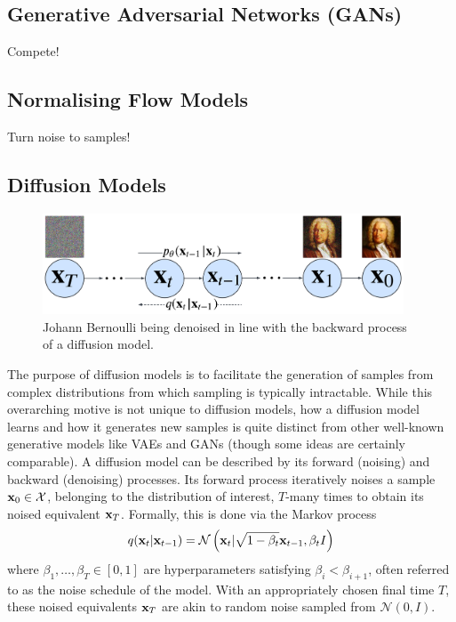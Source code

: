 \documentclass[11pt]{article}
\begin{document}
\subsection{Generative Adversarial Networks (GANs)}
Compete!

\subsection{Normalising Flow Models}
Turn noise to samples!

\subsection{Diffusion Models}

\begin{figure}[ht]
    \centering
    \includegraphics[height=3cm]{./figures/generative_models/diffusion_process.pdf}
    \caption{Johann Bernoulli being denoised in line with the backward process of a diffusion model.}
    \label{fig:diffusion_process}
\end{figure}

The purpose of diffusion models is to facilitate the generation of samples from complex distributions from which sampling is typically intractable. While this overarching motive is not unique to diffusion models, how a diffusion model learns and how it generates new samples is quite distinct from other well-known generative models like VAEs and GANs (though some ideas are certainly comparable). A diffusion model can be described by its forward (noising) and backward (denoising) processes. Its forward process iteratively noises a sample $\mathbf{x}_0\in\mathcal{X}$, belonging to the distribution of interest, $T$-many times to obtain its noised equivalent $\mathbf{x}_T$. Formally, this is done via the Markov process
$$
q(\mathbf{x}_t|\mathbf{x}_{t-1})
=
\mathcal{N}\left(\mathbf{x}_t|\sqrt{1-\beta_t}\mathbf{x}_{t-1},\beta_tI\right)
$$
where $\beta_1,\dots,\beta_T\in[0,1]$ are hyperparameters satisfying $\beta_i<\beta_{i+1}$, often referred to as the noise schedule of the model. With an appropriately chosen final time $T$, these noised equivalents $\mathbf{x}_T$ are akin to random noise sampled from $\mathcal{N}(0,I)$.
\end{document}

